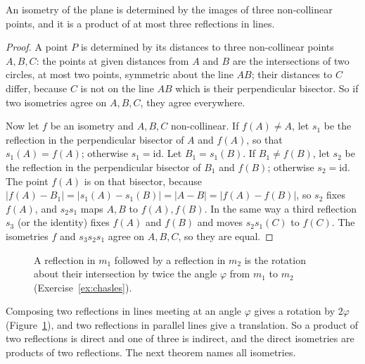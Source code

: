 \begin{theorem}\label{thm:threereflections}
An isometry of the plane is determined by the images of three non-collinear points, and it is a product of at most three
reflections in lines.
\end{theorem}
\begin{proof}
A point $P$ is determined by its distances to three non-collinear points $A,B,C$: the points at given distances from $A$ and $B$ are the
intersections of two circles, at most two points, symmetric about the line $AB$; their distances to $C$ differ, because $C$ is not on
the line $AB$ which is their perpendicular bisector. So if two isometries agree on $A,B,C$, they agree everywhere.

Now let $f$ be an isometry and $A,B,C$ non-collinear. If $f(A)\ne A$, let $s_1$ be the reflection in the perpendicular bisector of
$A$ and $f(A)$, so that $s_1(A)=f(A)$; otherwise $s_1=\mathrm{id}$. Let $B_1=s_1(B)$. If $B_1\ne f(B)$, let $s_2$ be the reflection in the
perpendicular bisector of $B_1$ and $f(B)$; otherwise $s_2=\mathrm{id}$. The point $f(A)$ is on that bisector, because
$|f(A)-B_1|=|s_1(A)-s_1(B)|=|A-B|=|f(A)-f(B)|$, so $s_2$ fixes $f(A)$, and $s_2s_1$ maps $A,B$ to $f(A),f(B)$. In the same way a third
reflection $s_3$ (or the identity) fixes $f(A)$ and $f(B)$ and moves $s_2s_1(C)$ to $f(C)$. The isometries $f$ and $s_3s_2s_1$ agree on
$A,B,C$, so they are equal.
\end{proof}

\begin{figure}[ht]
\centering
{}
\caption{A reflection in $m_1$ followed by a reflection in $m_2$ is the rotation about their intersection by twice the angle
$\varphi$ from $m_1$ to $m_2$ (Exercise~\ref{ex:chasles}).}
\label{fig:tworeflections}
\end{figure}

Composing two reflections in lines meeting at an angle $\varphi$ gives a rotation by $2\varphi$ (Figure~\ref{fig:tworeflections}), and
two reflections in parallel lines give a translation. So a product of two reflections is direct and one of three is indirect, and
the direct isometries are products of two reflections. The next theorem names all isometries.

